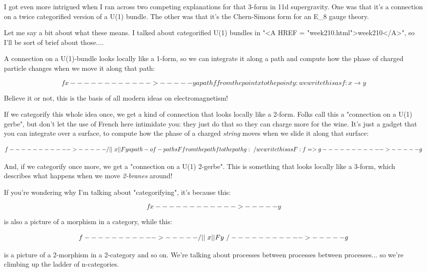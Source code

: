 I got even more intrigued when I ran across two competing 
explanations for that 3-form in 11d supergravity.  One was 
that it's a connection on a twice categorified version of 
a U(1) bundle.  The other was that it's the Chern-Simons
form for an E_{8} gauge theory. 

Let me say a bit about what these means.  I talked about categorified
U(1) bundles in "<A HREF = "week210.html">week210</A>", so
I'll be sort of brief about those....

A connection on a U(1)-bundle looks locally like a 1-form, 
so we can integrate it along a path and compute how the 
phase of charged particle changes when we move it along that 
path:

$$
             f
  x------------>-----y    a path f from the point x to the point y:
                                 we write this as f: x \to  y

$$
    
Believe it or not, this is the basis of all modern ideas on 
electromagnetism!

If we categorify this whole idea once, we get a kind of
connection that looks locally like a 2-form.  Folks call this
a "connection on a U(1) gerbe", but don't let the use of French 
here intimidate you: they just do that so they can charge more 
for the wine.  It's just a gadget that you can integrate over 
a surface, to compute how the phase of a charged \emph{string} moves 
when we slide it along that surface:

$$
              f
    ----------->-----
   /        ||       \
  x         ||F       y   a path-of-paths F from the path f to the path g:
   \        \/       /            we write this as F: f => g
    ----------->-----
               g
$$
    
And, if we categorify once more, we get a "connection on a 
U(1) 2-gerbe".  This is something that looks locally like a 
3-form, which describes what happens when we move \emph{2-branes} 
around!

If you're wondering why I'm talking about "categorifying", 
it's because this:

$$
             f
  x------------>-----y    
$$
    
is also a picture of a morphism in a category, while this:

$$
              f
    ----------->-----
   /        ||       \
  x         ||F       y  
   \        \/       /  
    ----------->-----
               g
$$
    
is a picture of a 2-morphism in a 2-category and so on.  We're
talking about processes between processes between processes... 
so we're climbing up the ladder of n-categories.

